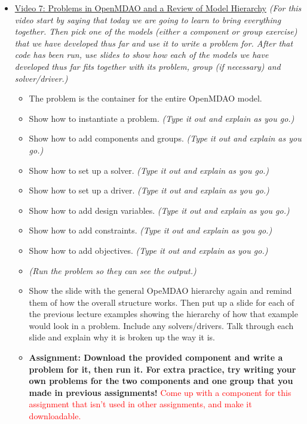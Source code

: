 \documentclass[12pt, letterpaper]{article}
\begin{document}
\begin{itemize}
	\item \underline{Video 7: Problems in OpenMDAO and a Review of Model Hierarchy} \textit{(For this video start by saying that today we are going to 	learn to bring everything together. Then pick one of the models (either a component or group exercise) that we have developed thus far and use it to write a problem for. After that code has been run, use slides to show how each of the models we have developed thus far fits together with its 			problem, group (if necessary) and solver/driver.)}
		\begin{itemize}
			\item The problem is the container for the entire OpenMDAO model.
			\item Show how to instantiate a problem. \textit{(Type it out and explain as you go.)}
			\item Show how to add components and groups. \textit{(Type it out and explain as you go.)}
			\item Show how to set up a solver. \textit{(Type it out and explain as you go.)}
			\item Show how to set up a driver. \textit{(Type it out and explain as you go.)}
			\item Show how to add design variables. \textit{(Type it out and explain as you go.)}
			\item Show how to add constraints. \textit{(Type it out and explain as you go.)}
			\item Show how to add objectives. \textit{(Type it out and explain as you go.)}
			\item \textit{(Run the problem so they can see the output.)}
			\item Show the slide with the general OpeMDAO hierarchy again and remind them of how the overall structure works. Then put up a slide 					for each of the previous lecture examples showing the hierarchy of how that example would look in a problem. Include any solvers/drivers. Talk 					through each slide and explain why it is broken up the way it is.
			\item \textbf{Assignment: Download the provided component and write a problem for it, then run it. For extra practice, try writing your own problems for the two components and one group that you made in previous assignments!} \textcolor{red}{Come up with a component for this assignment that isn't used in other assignments, and make it downloadable.}
		\end{itemize}


\end{itemize}
\end{document}
